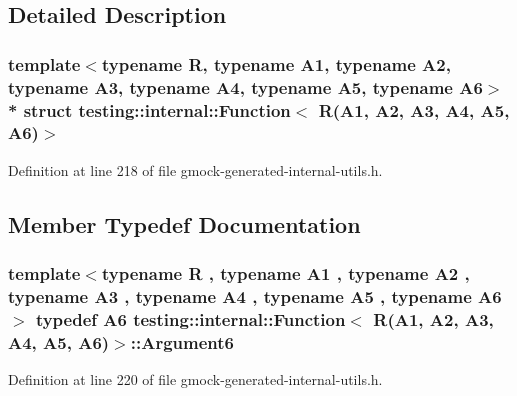 \subsection{Detailed Description}
\subsubsection*{template$<$typename R, typename A1, typename A2, typename A3, typename A4, typename A5, typename A6$>$\\*
struct testing\+::internal\+::\+Function$<$ R(\+A1, A2, A3, A4, A5, A6)$>$}



Definition at line 218 of file gmock-\/generated-\/internal-\/utils.\+h.



\subsection{Member Typedef Documentation}
\subsubsection[{\texorpdfstring{Argument6}{Argument6}}]{\setlength{\rightskip}{0pt plus 5cm}template$<$typename R , typename A1 , typename A2 , typename A3 , typename A4 , typename A5 , typename A6 $>$ typedef A6 {\bf testing\+::internal\+::\+Function}$<$ {\bf R}(A1, A2, A3, A4, A5, A6)$>$\+::{\bf Argument6}}\hypertarget{structtesting_1_1internal_1_1_function_3_01_r_07_a1_00_01_a2_00_01_a3_00_01_a4_00_01_a5_00_01_a6_08_4_ab69a06609b76f3b0ef780b9ecf0a940c}{}\label{structtesting_1_1internal_1_1_function_3_01_r_07_a1_00_01_a2_00_01_a3_00_01_a4_00_01_a5_00_01_a6_08_4_ab69a06609b76f3b0ef780b9ecf0a940c}


Definition at line 220 of file gmock-\/generated-\/internal-\/utils.\+h.

